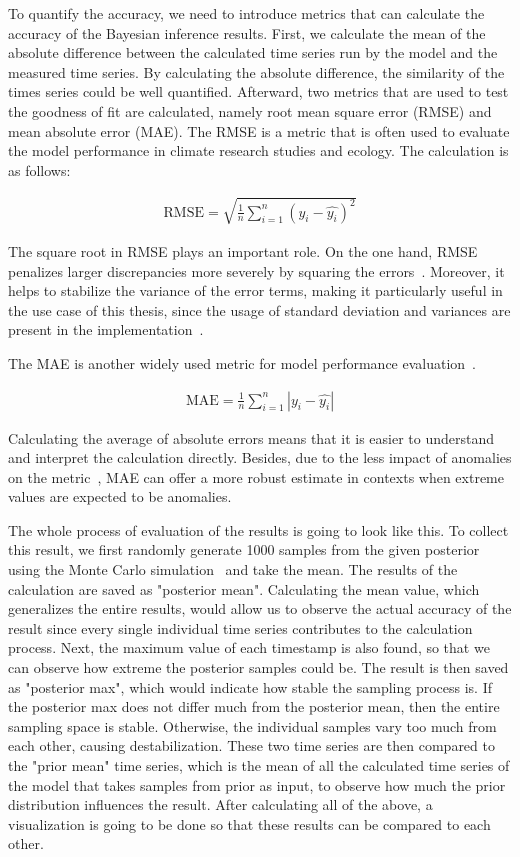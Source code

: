 To quantify the accuracy, we need to introduce metrics that can calculate the accuracy of the Bayesian inference results. First, we calculate the mean of the absolute difference between the calculated time series run by the model and the measured time series. By calculating the absolute difference, the similarity of the times series could be well quantified. Afterward, two metrics that are used to test the goodness of fit are calculated, namely root mean square error (RMSE) and mean absolute error (MAE). The RMSE is a metric that is often used to evaluate the model performance in climate research studies and ecology. The calculation is as follows: 

\begin{align}
\text{RMSE} = \sqrt{\frac 1 n \sum_{i=1}^n (y_i - \hat{y_i})^2}
\end{align}

The square root in RMSE plays an important role. On the one hand, RMSE penalizes larger discrepancies more severely by squaring the errors~\cite{RMSE_discrepency_penalty}. Moreover, it helps to stabilize the variance of the error terms, making it particularly useful in the use case of this thesis, since the usage of standard deviation and variances are present in the implementation~\cite{RMSE_MAE}.

The MAE is another widely used metric for model performance evaluation~\cite{RMSE_MAE}.

\begin{align}
\text{MAE} = \frac 1 n \sum_{i=1}^n |y_i - \hat{y_i}|
\end{align}

Calculating the average of absolute errors means that it is easier to understand and interpret the calculation directly. Besides, due to the less impact of anomalies on the metric~\cite{RMSE_MAE}, MAE can offer a more robust estimate in contexts when extreme values are expected to be anomalies.

The whole process of evaluation of the results is going to look like this. 
To collect this result, we first randomly generate 1000 samples from the given posterior using the Monte Carlo simulation~\cite{monte_carlo_simulation} and take the mean. The results of the calculation are saved as "posterior mean". Calculating the mean value, which generalizes the entire results, would allow us to observe the actual accuracy of the result since every single individual time series contributes to the calculation process. Next, the maximum value of each timestamp is also found, so that we can observe how extreme the posterior samples could be. The result is then saved as "posterior max", which would indicate how stable the sampling process is. If the posterior max does not differ much from the posterior mean, then the entire sampling space is stable. Otherwise, the individual samples vary too much from each other, causing destabilization. These two time series are then compared to the "prior mean" time series, which is the mean of all the calculated time series of the model that takes samples from prior as input, to observe how much the prior distribution influences the result. After calculating all of the above, a visualization is going to be done so that these results can be compared to each other. 

